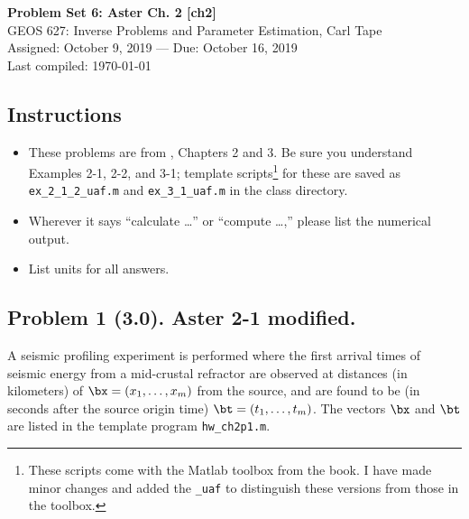 \documentclass[11pt,titlepage,fleqn]{article}
\begin{document}

\begin{spacing}{1.2}
\centering
{\large \bf Problem Set 6: Aster Ch. 2 [ch2]} \\
GEOS 627: Inverse Problems and Parameter Estimation, Carl Tape \\
Assigned: October 9, 2019 --- Due: October 16, 2019 \\
Last compiled: \today
\end{spacing}


\subsection*{Instructions}

\begin{itemize}
\item These problems are from \citet{AsterE2}, Chapters 2 and 3. Be sure you understand Examples 2-1, 2-2, and 3-1; template scripts\footnote{These scripts come with the Matlab toolbox from the book. I have made minor changes and added the {\tt \_uaf} to distinguish these versions from those in the toolbox.}  for these are saved as \verb+ex_2_1_2_uaf.m+ and \verb+ex_3_1_uaf.m+ in the class directory.
\item Wherever it says ``calculate \ldots'' or ``compute \ldots,'' please list the numerical output.
\item List units for all answers.
\end{itemize}

\subsection*{Problem 1 (3.0). Aster 2-1 modified.}

A seismic profiling experiment is performed where the first arrival times of seismic energy from a mid-crustal refractor are observed at distances (in kilometers) of $\bx = (x_1, \ldots, x_m)$ from the source, and are found to be (in seconds after the source origin time) $\bt = (t_1, \ldots, t_m)$. The vectors $\bx$ and $\bt$ are listed in the template program \verb+hw_ch2p1.m+.
\end{document}
